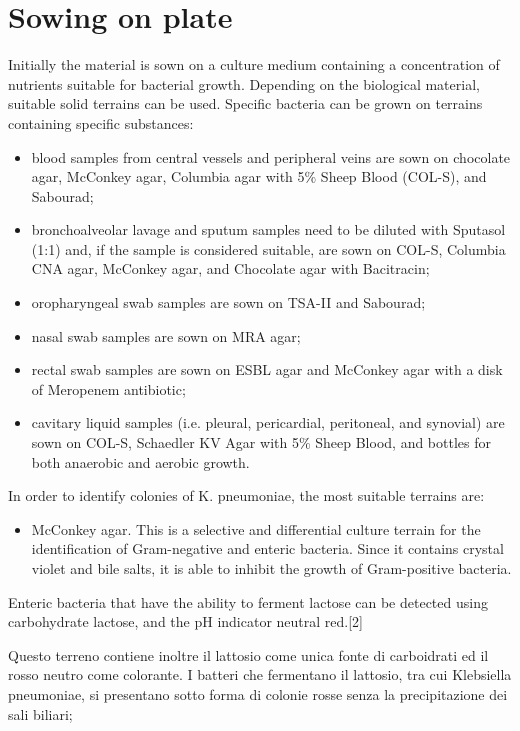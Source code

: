 \documentclass[11pt]{report}
\begin{document}
\section{Sowing on plate}
Initially the material is sown on a culture medium containing a concentration of nutrients suitable for bacterial growth.
Depending on the biological material, suitable solid terrains can be used. Specific bacteria can be grown on terrains containing specific substances:
\begin{itemize}
\item blood samples from central vessels and peripheral veins are sown on chocolate agar, McConkey agar, Columbia agar with 5$\%$ Sheep Blood (COL-S), and Sabourad;
\item bronchoalveolar lavage and sputum samples need to be diluted with Sputasol (1:1) and, if the sample is considered suitable, are sown on COL-S, Columbia CNA agar, McConkey agar, and Chocolate agar with Bacitracin;
\item oropharyngeal swab samples are sown on TSA-II and Sabourad;
\item nasal swab samples are sown on MRA agar;
\item rectal swab samples are sown on ESBL agar and McConkey agar with a disk of Meropenem antibiotic;
\item cavitary liquid samples (i.e. pleural, pericardial, peritoneal, and synovial) are sown on COL-S, Schaedler KV Agar with 5$\%$ Sheep Blood, and bottles for both anaerobic and aerobic growth.
\end{itemize}

In order to identify colonies of K. pneumoniae, the most suitable terrains are:
\begin{itemize}
\item McConkey agar.
This is a selective and differential culture terrain for the identification of Gram-negative and enteric bacteria.
Since it contains crystal violet and bile salts, it is able to inhibit the growth of Gram-positive bacteria.
\end{itemize}


 Enteric bacteria that have the ability to ferment lactose can be detected using carbohydrate lactose, and the pH indicator neutral red.[2]

 Questo terreno contiene inoltre il lattosio come unica fonte di carboidrati ed il rosso neutro come colorante. I batteri che fermentano il lattosio, tra
cui Klebsiella pneumoniae, si presentano sotto forma di colonie rosse senza la precipitazione
dei sali biliari;
\end{document}
